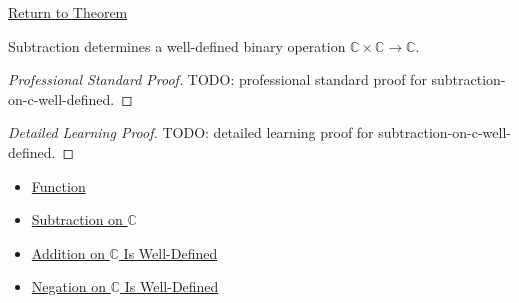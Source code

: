 \newpage
{}
\label{prf:subtraction-on-c-well-defined}

\begin{remark*}[Return]
\hyperref[thm:subtraction-on-c-well-defined]{Return to Theorem}
\end{remark*}

\begin{theorem*}
Subtraction determines a well-defined binary operation
\(\mathbb{C}\times\mathbb{C}\to\mathbb{C}\).
\end{theorem*}

\begin{proof}[Professional Standard Proof]
\LRAProofBodyStart
TODO: professional standard proof for subtraction-on-c-well-defined.
\end{proof}

\begin{proof}[Detailed Learning Proof]
\LRAProofBodyStart
TODO: detailed learning proof for subtraction-on-c-well-defined.
\end{proof}

\begin{remark*}
\end{remark*}

\begin{dependencies}
\begin{itemize}
  \item \hyperref[def:function]{Function}
  \item \hyperref[def:subtraction-on-c]{Subtraction on $\mathbb{C}$}
  \item \hyperref[thm:addition-on-c-well-defined]{Addition on $\mathbb{C}$ Is Well-Defined}
  \item \hyperref[thm:negation-on-c-well-defined]{Negation on $\mathbb{C}$ Is Well-Defined}
\end{itemize}
\end{dependencies}

\clearpage
